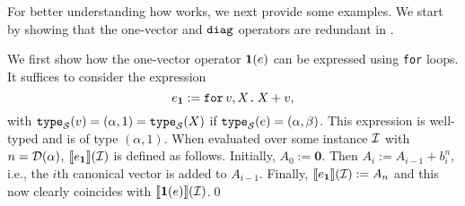 %
%
%
%





For better understanding how \langfor  works, we next provide some  examples.
We start by showing that the one-vector and $\texttt{diag}$ operators are redundant
in \langfor.
\begin{example}\label{ex:onevec}
We first show how the one-vector operator $\mathbf{1}(e)$ can be expressed using \texttt{for} loops.
It suffices to consider the expression
$$e_{\mathbf{1}}:=\texttt{for}\, v,X \texttt{.}\, X+v,$$
with $\texttt{type}_{\mathcal{S}}(v)=(\alpha,1)=\texttt{type}_{\mathcal{S}}(X)$ if $\texttt{type}_{\mathcal{S}}(e)=(\alpha,\beta)$. This expression is well-typed
and is of type $(\alpha,1)$. When evaluated over some instance $\mathcal{I}$ with $n=\mathcal{D}(\alpha)$, $\llbracket e_{\mathbf{1}} \rrbracket(\mathcal{I})$ is defined as follows.
Initially, $A_0:=\mathbf{0}$. Then $A_i:=A_{i-1}+b_i^n$, i.e., the $i$th canonical vector is added to $A_{i-1}$.
Finally, $\llbracket e_{\mathbf{1}} \rrbracket(\mathcal{I}):=A_n$ and this now clearly coincides with $\llbracket \mathbf{1}(e) \rrbracket(\mathcal{I})$.\qed
\end{example}


